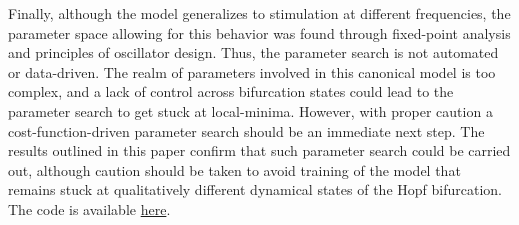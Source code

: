 \documentclass{article}
\begin{document}
Finally, although the model generalizes to stimulation at different frequencies, the parameter space allowing for this behavior was found through fixed-point analysis and principles of oscillator design. Thus, the parameter search is not automated or data-driven. The realm of parameters involved in this canonical model is too complex, and a lack of control across bifurcation states could lead to the parameter search to get stuck at local-minima. However, with proper caution a cost-function-driven parameter search should be an immediate next step. The results outlined in this paper confirm that such parameter search could be carried out, although caution should be taken to avoid training of the model that remains stuck at qualitatively different dynamical states of the Hopf bifurcation.\\

The code is available \href{https://github.com/wisamreid/GrFNNMotor.git}{here}.



\end{document}
